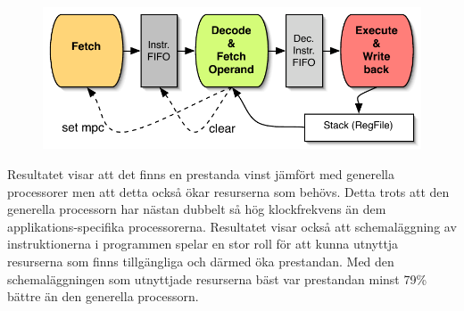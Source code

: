 \documentclass{popsci}
\begin{document}
{\begin{figure}[!bth] %
\includegraphics[width=\columnwidth]{samplePic.pdf} 
\end{figure}
Resultatet visar att det finns en prestanda vinst jämfört med generella processorer men att detta också ökar resurserna som behövs. Detta trots att den generella processorn har nästan dubbelt så hög klockfrekvens än dem applikations-specifika processorerna. Resultatet visar också att schemaläggning av instruktionerna i programmen spelar en stor roll för att kunna utnyttja resurserna som finns tillgängliga och därmed öka prestandan. Med den schemaläggningen som utnyttjade resurserna bäst var prestandan minst 79\% bättre än den generella processorn.
}
\end{document}
